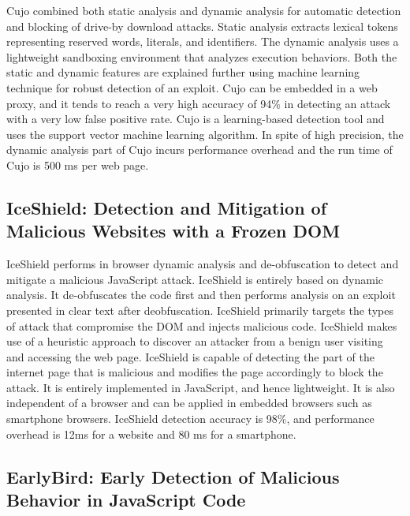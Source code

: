 Cujo combined both static analysis and dynamic analysis for automatic detection and blocking of drive-by download attacks. Static analysis extracts lexical tokens representing reserved words, literals, and identifiers. The dynamic analysis uses a lightweight sandboxing environment that analyzes execution behaviors. Both the static and dynamic features are explained further using machine learning technique for robust detection of an exploit. Cujo can be embedded in a web proxy, and it tends to reach a very high accuracy of 94\% in detecting an attack with a very low false positive rate. Cujo is a learning-based detection tool and uses the support vector machine learning algorithm. In spite of high precision, the dynamic analysis part of Cujo incurs performance overhead and the run time of Cujo is 500 ms per web page.

\subsection{IceShield: Detection and Mitigation of Malicious Websites with a Frozen DOM ~\cite{g25}} \label{iceShield}

IceShield performs in browser dynamic analysis and de-obfuscation to detect and mitigate a malicious JavaScript attack. IceShield is entirely based on dynamic analysis. It de-obfuscates the code first and then performs analysis on an exploit presented in clear text after deobfuscation. IceShield primarily targets the types of attack that compromise the DOM and injects malicious code. IceShield makes use of a heuristic approach to discover an attacker from a benign user visiting and accessing the web page. IceShield is capable of detecting the part of the internet page that is malicious and modifies the page accordingly to block the attack. It is entirely implemented in JavaScript, and hence lightweight. It is also independent of a browser and can be applied in embedded browsers such as smartphone browsers. IceShield detection accuracy is 98\%, and performance overhead is 12ms for a website and 80 ms for a smartphone.

\subsection{EarlyBird: Early Detection of Malicious Behavior in JavaScript Code ~\cite{g25}}

